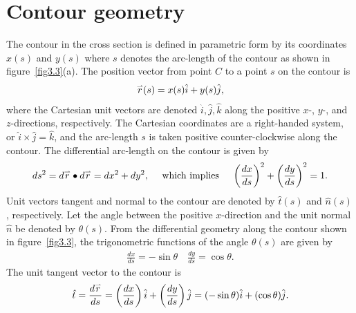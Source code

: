 \documentclass{AeroStructure-ERJohnson}
\def\harp#1{\smash{\mathord{\buildrel{\lower3pt\hbox{$\scriptscriptstyle\rightharpoonup$}}\over{#1}}}}
\begin{document}
\vfill\pagebreak

\section{Contour geometry}\label{sec3.2}

The contour in the cross section is defined in parametric form by its coordinates $x(s)$ and $y(s)$ where $s$ denotes the arc-length of the contour as shown in figure~\ref{fig3.3}(a). The position vector from point $C$ to a point $s$ on the contour is
\begin{align}\label{eq3.1}
\harp{r}(s)=x(s) \hat{i}+y(s) \hat{j},
\end{align}
where the Cartesian unit vectors are denoted $\hat{i}, \hat{j}, \hat{k}$ along the positive $x$-, $y$-, and $z$-directions, respectively. The Cartesian coordinates are a right-handed system, or $\hat{i} \times \hat{j}=\hat{k}$, and the arc-length $s$ is taken positive counter-clockwise along the contour. The differential arc-length on the contour is given by
\begin{align}\label{eq3.2}
d s^{2}=d \harp{r} \bullet d \harp{r}=d x^{2}+d y^{2}, \quad~\text{which implies } \quad\left(\frac{d x}{d s}\right)^{2}+\left(\frac{d y}{d s}\right)^{2}=1.
\end{align}
Unit vectors tangent and normal to the contour are denoted by $\hat{t}(s)$ and $\hat{n}(s)$, respectively. Let the angle between the positive $x$-direction and the unit normal $\hat{n}$ be denoted by $\theta(s)$. From the differential geometry along the contour shown in figure~\ref{fig3.3}, the trigonometric functions of the angle $\theta(s)$ are given by
\begin{align}\label{eq3.3}
\frac{d x}{d s}=-\sin \theta \quad \frac{d y}{d s}=\cos \theta.
\end{align}
{\def\thefigure{3.3}
}
The unit tangent vector to the contour is
\begin{align}\label{eq3.4}
\hat{t}=\frac{d \harp{r}}{d s}=\left(\frac{d x}{d s}\right) \hat{i}+\left(\frac{d y}{d s}\right) \hat{j}=(-\sin \theta) \hat{i}+(\cos \theta) \hat{j}.
\end{align}
\end{document}
